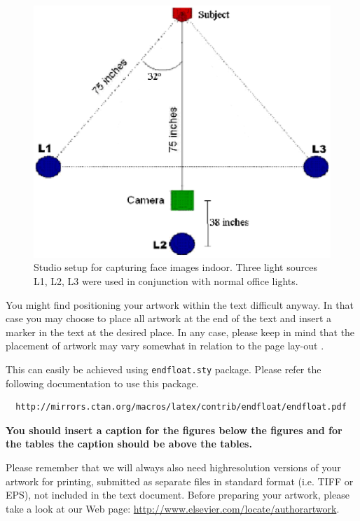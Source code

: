 \documentclass[times,onecolumn,final,longtitle]{elsarticle}
\begin{document}
\begin{figure}[!t]
\centering
\includegraphics[scale=.5]{smhlfig01}
\caption{Studio setup for capturing face images indoor. Three light
sources L1, L2, L3 were used in conjunction with normal office lights.}
\end{figure}

You might find positioning your artwork within the text difficult
anyway. In that case you may choose to place all artwork at the end of
the text and insert a marker in the text at the desired place. In any
case, please keep in mind that the placement of artwork may vary
somewhat in relation to the page lay-out \cite{HullermeierRifqi2009}.

This can easily be achieved using \verb+endfloat.sty+ package. Please
refer the following documentation to use this package.
\begin{verbatim}
  http://mirrors.ctan.org/macros/latex/contrib/endfloat/endfloat.pdf
\end{verbatim}

\textcolor{newcolor}{\bf You should insert a caption for the figures
below the figures and for the tables the caption should be above the
tables.}

Please remember that we will always also need highresolution versions
of your artwork for printing, submitted as separate files in standard
format (i.e. TIFF or EPS), not included in the text document. Before
preparing your artwork, please take a look at our Web page:
\url{http://www.elsevier.com/locate/authorartwork}.
\end{document}
